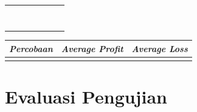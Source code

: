 \begin{table}[H]
\begin{tabular}{|c|c|l|l|l|l|l|}
                         &                       &               &  &                                         &                                      &               \\ \cline{1-3} \cline{5-7} 
                         &                       &               &  &                                         &                                      &               \\ \cline{1-3} \cline{5-7} 
                         &                       &               &  &                                         &                                      &               \\ \cline{1-3} \cline{5-7} 
  \multicolumn{1}{|l|}{} & \multicolumn{1}{l|}{} &               &  &                                         &                                      &               \\ \cline{1-3} \cline{5-7} 
  \multicolumn{1}{|l|}{} & \multicolumn{1}{l|}{} &               &  &                                         &                                      &               \\ \cline{1-3} \cline{5-7} 
  \multicolumn{1}{|l|}{} & \multicolumn{1}{l|}{} &               &  &                                         &                                      &               \\ \cline{1-3} \cline{5-7} 
  \multicolumn{1}{|l|}{} & \multicolumn{1}{l|}{} &               &  &                                         &                                      &               \\ \cline{1-3} \cline{5-7} 
  \multicolumn{1}{|l|}{} & \multicolumn{1}{l|}{} &               &  &                                         &                                      &               \\ \cline{1-3} \cline{5-7} 
  \end{tabular}
  \end{table}


\begin{table}[H]
  \centering
    \begin{tabular}{|c|c|l|}
    \hline
    \textit{Percobaan} & \textit{Average Profit} & \textit{Average Loss} \\ \hline
                       &                         &                       \\ \hline
    \end{tabular}
\end{table}

\section{Evaluasi Pengujian}
\label{sec:analisispengujian}

